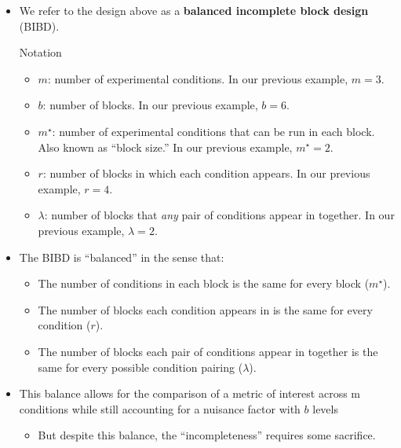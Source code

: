 \begin{itemize}
\begin{table}[!htbp]
            \end{table}
      \item We refer to the design above as a \textbf{balanced incomplete block design} (BIBD).
            \begin{Remark}{Notation}{}
                  \begin{itemize}
                        \item $ m $: number of experimental conditions. In our previous example, $ m=3 $.
                        \item $ b $: number of blocks. In our previous example, $ b=6 $.
                        \item $ m^\star $: number of experimental conditions that can be run in each block. Also known as ``block size.'' In our previous example, $ m^\star=2 $.
                        \item $ r $: number of blocks in which each condition appears. In our previous example, $ r=4 $.
                        \item $ \lambda $: number of blocks that \emph{any} pair of conditions appear in together. In our previous example, $ \lambda=2 $.
                  \end{itemize}
            \end{Remark}
      \item The BIBD is ``balanced'' in the sense that:
            \begin{itemize}
                  \item The number of conditions in each block is the same for every block ($ m^\star $).
                  \item The number of blocks each condition appears in is the same for every condition ($ r $).
                  \item The number of blocks each pair of conditions appear in together is the same for every possible
                        condition pairing ($ \lambda $).
            \end{itemize}
      \item This balance allows for the comparison of a metric of interest across m conditions while still accounting
            for a nuisance factor with $b$ levels
            \begin{itemize}
                  \item But despite this balance, the ``incompleteness'' requires some sacrifice.
            \end{itemize}
\end{itemize}
